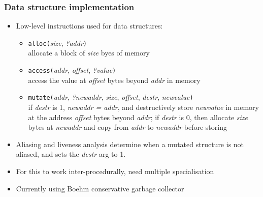 \documentclass[12pt]{beamer}
\begin{document}
\begin{frame}[fragile]
\frametitle{Data structure implementation}
\begin{itemize}
\item Low-level instructions used for data structures:
  \begin{itemize}
  \item \texttt{alloc(}\emph{size}, \emph{?addr}\texttt{)} \\
    allocate a block of \emph{size} byes of memory
  \item \texttt{access(}\emph{addr}, \emph{offset}, \emph{?value}\texttt{)} \\
    access the value at \emph{offset} bytes beyond \emph{addr} in memory
  \item \texttt{mutate(}\emph{addr}, \emph{?newaddr}, \emph{size},
    \emph{offset}, \emph{destr}, \emph{newvalue}\texttt{)} \\
    if \emph{destr} is 1, \emph{newaddr = addr}, and destructively store
    \emph{newvalue} in memory at the address \emph{offset} bytes beyond
    \emph{addr}; if \emph{destr} is 0, then allocate \emph{size} bytes at
    \emph{newaddr} and copy from \emph{addr} to \emph{newaddr} before storing
  \end{itemize}
\item Aliasing and liveness analysis determine when a mutated structure is not
  aliased, and sets the \emph{destr} arg to 1.
\item For this to work inter-procedurally, need multiple specialisation
\item Currently using Boehm conservative garbage collector
\end{itemize}
\end{frame}
\end{document}
